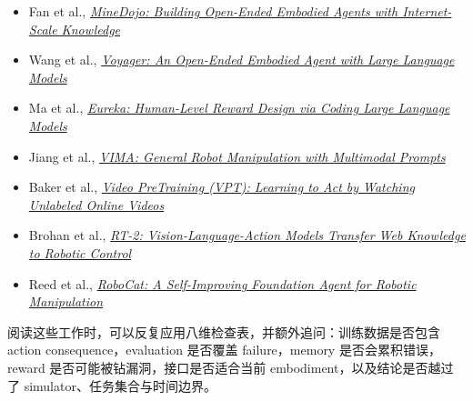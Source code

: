 \begingroup
\footnotesize
\begin{itemize}[itemsep=0pt,topsep=0.15em,parsep=0pt]
  \item Fan et al., \href{https://arxiv.org/abs/2206.08853}{\emph{MineDojo: Building Open-Ended Embodied Agents with Internet-Scale Knowledge}}
  \item Wang et al., \href{https://arxiv.org/abs/2305.16291}{\emph{Voyager: An Open-Ended Embodied Agent with Large Language Models}}
  \item Ma et al., \href{https://arxiv.org/abs/2310.12931}{\emph{Eureka: Human-Level Reward Design via Coding Large Language Models}}
  \item Jiang et al., \href{https://arxiv.org/abs/2210.03094}{\emph{VIMA: General Robot Manipulation with Multimodal Prompts}}
  \item Baker et al., \href{https://arxiv.org/abs/2206.11795}{\emph{Video PreTraining (VPT): Learning to Act by Watching Unlabeled Online Videos}}
  \item Brohan et al., \href{https://arxiv.org/abs/2307.15818}{\emph{RT-2: Vision-Language-Action Models Transfer Web Knowledge to Robotic Control}}
  \item Reed et al., \href{https://arxiv.org/abs/2306.11706}{\emph{RoboCat: A Self-Improving Foundation Agent for Robotic Manipulation}}
\end{itemize}

阅读这些工作时，可以反复应用八维检查表，并额外追问：训练数据是否包含 action consequence，evaluation 是否覆盖 failure，memory 是否会累积错误，reward 是否可能被钻漏洞，接口是否适合当前 embodiment，以及结论是否越过了 simulator、任务集合与时间边界。
\endgroup


